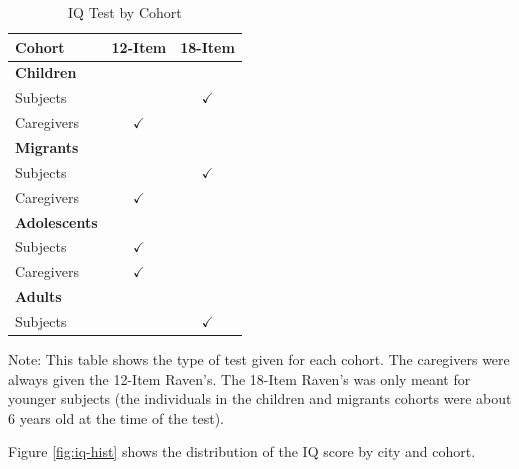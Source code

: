 \begin{table}[H]
\begin{center}
	\caption{IQ Test by Cohort}\label{tab:test-type}
	\begin{tabular}{lcc}
		\toprule
		Cohort & 12-Item & 18-Item \\
		\midrule
		\textbf{Children} & &\\
		\quad Subjects & & $\checkmark$  \\
		\quad Caregivers &  $\checkmark$ & \\
		\textbf{Migrants} & & \\
		\quad Subjects & & $\checkmark$ \\
		\quad Caregivers & $\checkmark$ &  \\
		\textbf{Adolescents} & & \\
		\quad Subjects & $\checkmark$ & \\
		\quad Caregivers &  $\checkmark$ &  \\
		\textbf{Adults} & & \\
		\quad Subjects & & $\checkmark$ \\
		\bottomrule
	\end{tabular}
\end{center}
\raggedright \footnotesize Note: This table shows the type of test given for each cohort. The caregivers were always given the 12-Item Raven's. The 18-Item Raven's was only meant for younger subjects (the individuals in the children and migrants cohorts were about 6 years old at the time of the test).
\end{table}

Figure \ref{fig:iq-hist} shows the distribution of the IQ score by city and cohort. 

